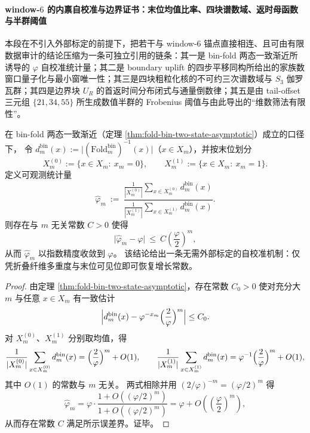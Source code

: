 \paragraph{window-\texorpdfstring{$6$}{6} 的内禀自校准与边界证书：末位均值比率、四块谱数域、返时母函数与半群阈值}
本段在不引入外部标定的前提下，把若干与 window-\(6\) 锚点直接相连、且可由有限数据审计的结论压缩为一条可独立引用的链条：其一是 bin-fold 两态一致渐近所诱导的 \(\varphi\) 自校准统计量；其二是 boundary uplift 的四步平移同构所给出的家族数窗口量子化与最小窗唯一性；其三是四块粗粒化核的不可约三次谱数域与 \(S_3\) 伽罗瓦群；其四是边界块 \(U_R\) 的首返时间分布闭式与通量倒数律；其五是由 tail-offset 三元组 \(\{21,34,55\}\) 所生成数值半群的 Frobenius 阈值与由此导出的“维数筛法有限性”。
\par

\begin{theorem}\label{thm:xi-foldbin-intrinsic-self-calibration-phi-lastbit-means}
在 bin-fold 两态一致渐近（定理 \ref{thm:fold-bin-two-state-asymptotic}）成立的口径下，
令 \(d_m^{\mathrm{bin}}(x):=\bigl|(\mathrm{Fold}^{\mathrm{bin}}_m)^{-1}(x)\bigr|\)（\(x\in X_m\)），并按末位划分
\[
X_m^{(0)}:=\{x\in X_m:\ x_m=0\},
\qquad
X_m^{(1)}:=\{x\in X_m:\ x_m=1\}.
\]
定义可观测统计量
\[
\widehat\varphi_m
\ :=\
\frac{\frac{1}{|X_m^{(0)}|}\sum_{x\in X_m^{(0)}} d_m^{\mathrm{bin}}(x)}{\frac{1}{|X_m^{(1)}|}\sum_{x\in X_m^{(1)}} d_m^{\mathrm{bin}}(x)}.
\]
则存在与 \(m\) 无关常数 \(C>0\) 使得
\[
\bigl|\widehat\varphi_m-\varphi\bigr|\ \le\ C\left(\frac{\varphi}{2}\right)^m,
\]
从而 \(\widehat\varphi_m\) 以指数精度收敛到 \(\varphi\)。
该结论给出一条无需外部标定的自校准机制：仅凭折叠纤维多重度与末位可见位即可恢复增长常数。
\end{theorem}

\begin{proof}
由定理 \ref{thm:fold-bin-two-state-asymptotic}，存在常数 \(C_0>0\) 使对充分大 \(m\) 与任意 \(x\in X_m\) 有一致估计
\[
\Bigl|d_m^{\mathrm{bin}}(x)-\varphi^{-x_m}\Bigl(\frac{2}{\varphi}\Bigr)^m\Bigr|\le C_0.
\]
对 \(X_m^{(0)}\)、\(X_m^{(1)}\) 分别取均值，得
\[
\frac{1}{|X_m^{(0)}|}\sum_{x\in X_m^{(0)}} d_m^{\mathrm{bin}}(x)
=\Bigl(\frac{2}{\varphi}\Bigr)^m+O(1),
\qquad
\frac{1}{|X_m^{(1)}|}\sum_{x\in X_m^{(1)}} d_m^{\mathrm{bin}}(x)
=\varphi^{-1}\Bigl(\frac{2}{\varphi}\Bigr)^m+O(1),
\]
其中 \(O(1)\) 的常数与 \(m\) 无关。
两式相除并用 \((2/\varphi)^{-m}=(\varphi/2)^m\) 得
\[
\widehat\varphi_m=\varphi\cdot\frac{1+O((\varphi/2)^m)}{1+O((\varphi/2)^m)}
=\varphi+O\!\left(\left(\frac{\varphi}{2}\right)^m\right),
\]
从而存在常数 \(C\) 满足所示误差界。证毕。
\end{proof}

